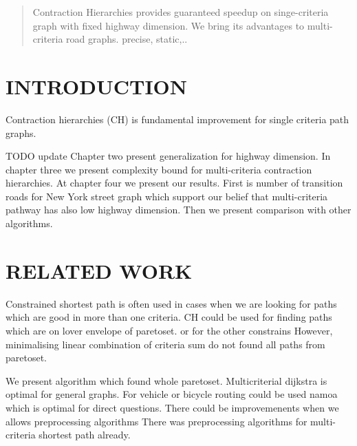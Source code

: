 
\begin{abstract}

Contraction Hierarchies provides guaranteed speedup on singe-criteria graph
with fixed highway dimension. We bring its advantages to multi-criteria 
road graphs.
precise, static,..

\end{abstract}

\section{INTRODUCTION}

Contraction hierarchies (CH) \cite{geisberger2008contraction}
is fundamental improvement for single criteria path graphs.


TODO update 
Chapter two present generalization for highway dimension. In chapter
three we present complexity bound for multi-criteria contraction hierarchies.
At chapter four we present our results. First is number of transition roads for
New York street graph which support our belief that multi-criteria pathway
has also low highway dimension.
Then we present comparison with other algorithms.



\section{RELATED WORK}

Constrained shortest path 
\cite{pugliese2013survey} is often used in cases when we are looking for
paths which are good in more than one criteria.
CH could be used for finding 
paths which are on lover envelope of paretoset.
\cite{funke2013polynomial}
or for the other constrains 
However, minimalising linear combination of criteria sum 
do not found all paths from paretoset.

We present algorithm which found whole paretoset.
Multicriterial dijkstra is optimal for general graphs.
For vehicle or bicycle routing could be used namoa
which is optimal for direct questions.
There could be improvemenents when we allows preprocessing
algorithms 
There was preprocessing algorithms for multi-criteria
shortest path already.
\cite{kohler2005acceleration} 

